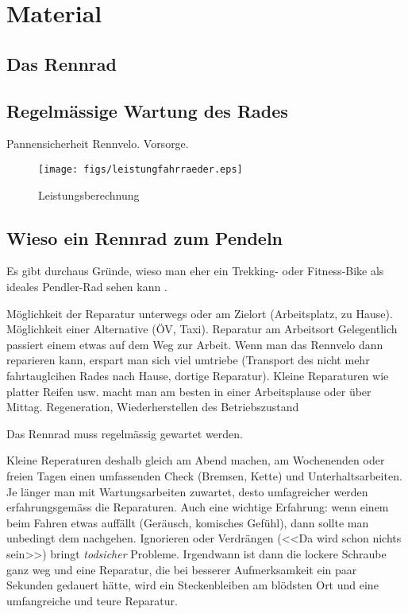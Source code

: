 \documentclass[a4paper,DIV13,BCOR1cm]{scrbook}
\begin{document}



\chapter{Material}
\section{Das Rennrad}

\section{Regelmässige Wartung des Rades}
Pannensicherheit Rennvelo. Vorsorge.
\begin{figure}[htpb]
        \centering
        \texttt{[image: figs/leistungfahrraeder.eps]}
        \caption{Leistungsberechnung}
        \label{fig:leistungfahrraeder}
\end{figure}


\section{Wieso ein Rennrad zum Pendeln}

Es gibt durchaus Gründe, wieso man eher ein Trekking- oder Fitness-Bike als ideales Pendler-Rad sehen kann \cite{Lindthaler2015perfektesfahrradpendler}.



Möglichkeit der Reparatur unterwegs oder am Zielort (Arbeitsplatz, zu Hause). Möglichkeit einer Alternative (ÖV, Taxi).
Reparatur am Arbeitsort
Gelegentlich passiert einem etwas auf dem Weg zur Arbeit. Wenn man das Rennvelo dann reparieren kann, erspart man sich viel umtriebe (Transport des nicht mehr fahrtauglcihen Rades nach Hause, dortige Reparatur). Kleine Reparaturen wie platter Reifen usw. macht man am besten in einer Arbeitsplause oder über Mittag.
Regeneration, Wiederherstellen des Betriebszustand

Das Rennrad muss regelmässig gewartet werden.

Kleine Reperaturen deshalb gleich am Abend machen, am Wochenenden oder freien Tagen einen umfassenden Check (Bremsen, Kette) und Unterhaltsarbeiten.
Je länger man mit Wartungsarbeiten zuwartet, desto umfagreicher werden erfahrungsgemäss die Reparaturen.
Auch eine wichtige Erfahrung: wenn einem beim Fahren etwas auffällt (Geräusch, komisches Gefühl), dann sollte man unbedingt dem nachgehen.
Ignorieren oder Verdrängen (<<Da wird schon nichts sein>>) bringt \emph{todsicher} Probleme.
Irgendwann ist dann die lockere Schraube ganz weg und eine Reparatur, die bei besserer Aufmerksamkeit ein paar Sekunden gedauert hätte,
wird ein Steckenbleiben am blödsten Ort und eine umfangreiche und teure Reparatur.
\end{document}
